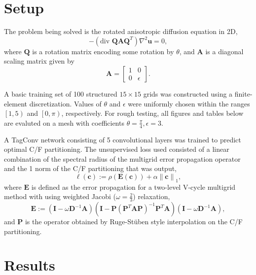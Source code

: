\documentclass{article}
\newcommand{\norm}[1]{\left\lVert#1\right\rVert}
\newcommand{\mat}[1]{\bm{{#1}}}
\renewcommand{\vec}[1]{\bm{{#1}}}
\newcommand{\grad}{\nabla}
\begin{document}
\section{Setup}
The problem being solved is the rotated anisotropic diffusion equation in 2D,
\begin{equation}
  -\left(\text{div } \mat{Q}\mat{A}\mat{Q}^T\right) \grad^2 \vec{u} = 0,
\end{equation}
where $\mat{Q}$ is a rotation matrix encoding some rotation by $\theta$, and $\mat{A}$ is a diagonal
scaling matrix given by
\begin{equation}
  \mat{A} = \begin{bmatrix} 1 & 0 \\ 0 & \epsilon \end{bmatrix}.
\end{equation}

A basic training set of 100 structured $15 \times 15$ grids was constructed using a finite-element discretization.  Values of $\theta$ and $\epsilon$ were uniformly chosen within the ranges $\left[1,5\right)$ and $\left[0,\pi\right)$, respectively.  For rough testing, all figures and tables below are evaluted on a mesh with coefficients $\theta=\frac{\pi}{4}, \epsilon=3$.

    A TagConv network consisting of 5 convolutional layers was trained to predict optimal C/F partitioning. The unsupervised loss used consisted of a linear combination of the spectral radius of the multigrid error propagation operator and the 1 norm of the C/F partitioning that was output,
    \begin{equation}
      \ell\left(\vec{c}\right) := \rho\left(\mat{E}\left(\vec{c}\right)\right) + \alpha \norm{\vec{c}}_1,
    \end{equation}
    where $\mat{E}$ is defined as the error propagation for a two-level V-cycle multigrid method with using weighted Jacobi ($\omega=\frac{2}{3}$) relaxation,
    \begin{equation}
      \mat{E} := \left(\mat{I} - \omega\mat{D}^{-1}\mat{A}\right) \left(\mat{I} - \mat{P}\left(\mat{P}^T\mat{A}\mat{P}\right)^{-1}\mat{P}^T\mat{A}\right) \left(\mat{I} - \omega\mat{D}^{-1}\mat{A}\right),
    \end{equation}
    and $\mat{P}$ is the operator obtained by Ruge-St\"uben style interpolation on the C/F partitioning.
\section{Results}
\end{document}
